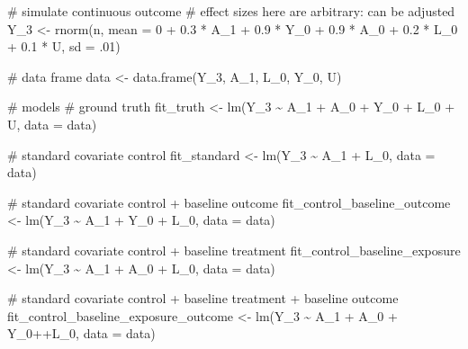 \documentclass[
  singlecolumn]{article}
\newenvironment{Shaded}{\begin{snugshade}}{\end{snugshade}}
\newcommand{\AttributeTok}[1]{\textcolor[rgb]{0.40,0.45,0.13}{#1}}
\newcommand{\CommentTok}[1]{\textcolor[rgb]{0.37,0.37,0.37}{#1}}
\newcommand{\DecValTok}[1]{\textcolor[rgb]{0.68,0.00,0.00}{#1}}
\newcommand{\FloatTok}[1]{\textcolor[rgb]{0.68,0.00,0.00}{#1}}
\newcommand{\FunctionTok}[1]{\textcolor[rgb]{0.28,0.35,0.67}{#1}}
\newcommand{\NormalTok}[1]{\textcolor[rgb]{0.00,0.23,0.31}{#1}}
\newcommand{\OtherTok}[1]{\textcolor[rgb]{0.00,0.23,0.31}{#1}}
\newcommand{\SpecialCharTok}[1]{\textcolor[rgb]{0.37,0.37,0.37}{#1}}
\begin{document}
\begin{Shaded}
\begin{Highlighting}[]
\CommentTok{\# simulate continuous outcome}
\CommentTok{\# effect sizes here are arbitrary: can be adjusted}
\NormalTok{Y\_3 }\OtherTok{\textless{}{-}}
  \FunctionTok{rnorm}\NormalTok{(n,}
        \AttributeTok{mean =} \DecValTok{0} \SpecialCharTok{+}
          \FloatTok{0.3} \SpecialCharTok{*}\NormalTok{ A\_1 }\SpecialCharTok{+}
          \FloatTok{0.9} \SpecialCharTok{*}\NormalTok{ Y\_0 }\SpecialCharTok{+}
          \FloatTok{0.9} \SpecialCharTok{*}\NormalTok{ A\_0 }\SpecialCharTok{+}
          \FloatTok{0.2} \SpecialCharTok{*}\NormalTok{  L\_0 }\SpecialCharTok{+}
          \FloatTok{0.1} \SpecialCharTok{*}\NormalTok{ U,}
        \AttributeTok{sd =}\NormalTok{ .}\DecValTok{01}\NormalTok{)}

\CommentTok{\# data frame}
\NormalTok{data }\OtherTok{\textless{}{-}} \FunctionTok{data.frame}\NormalTok{(Y\_3, A\_1, L\_0, Y\_0, U)}


\CommentTok{\# models}
\CommentTok{\# ground truth}
\NormalTok{fit\_truth }\OtherTok{\textless{}{-}} \FunctionTok{lm}\NormalTok{(Y\_3 }\SpecialCharTok{\textasciitilde{}}\NormalTok{ A\_1 }\SpecialCharTok{+}\NormalTok{ A\_0 }\SpecialCharTok{+}\NormalTok{ Y\_0 }\SpecialCharTok{+}\NormalTok{ L\_0 }\SpecialCharTok{+}\NormalTok{ U, }\AttributeTok{data =}\NormalTok{ data)}

\CommentTok{\# standard covariate control}
\NormalTok{fit\_standard }\OtherTok{\textless{}{-}} \FunctionTok{lm}\NormalTok{(Y\_3 }\SpecialCharTok{\textasciitilde{}}\NormalTok{ A\_1 }\SpecialCharTok{+}\NormalTok{ L\_0, }\AttributeTok{data =}\NormalTok{ data)}

\CommentTok{\# standard covariate control + baseline outcome}
\NormalTok{fit\_control\_baseline\_outcome }\OtherTok{\textless{}{-}} \FunctionTok{lm}\NormalTok{(Y\_3 }\SpecialCharTok{\textasciitilde{}}\NormalTok{ A\_1 }\SpecialCharTok{+}\NormalTok{ Y\_0 }\SpecialCharTok{+}\NormalTok{ L\_0,}
                                   \AttributeTok{data =}\NormalTok{ data)}

\CommentTok{\# standard covariate control + baseline treatment}
\NormalTok{fit\_control\_baseline\_exposure }\OtherTok{\textless{}{-}} \FunctionTok{lm}\NormalTok{(Y\_3 }\SpecialCharTok{\textasciitilde{}}\NormalTok{ A\_1 }\SpecialCharTok{+}\NormalTok{ A\_0 }\SpecialCharTok{+}\NormalTok{ L\_0,}
                                    \AttributeTok{data =}\NormalTok{ data)}

\CommentTok{\# standard covariate control + baseline treatment + baseline outcome}
\NormalTok{fit\_control\_baseline\_exposure\_outcome }\OtherTok{\textless{}{-}}
  \FunctionTok{lm}\NormalTok{(Y\_3 }\SpecialCharTok{\textasciitilde{}}\NormalTok{ A\_1 }\SpecialCharTok{+}\NormalTok{ A\_0 }\SpecialCharTok{+}\NormalTok{ Y\_0}\SpecialCharTok{++}\NormalTok{L\_0,}
     \AttributeTok{data =}\NormalTok{ data)}


\end{Highlighting}
\end{Shaded}
\end{document}
